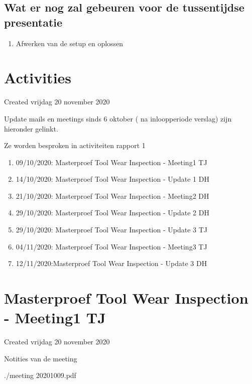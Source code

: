 \documentclass{article}
\begin{document}
\subsection{Wat er nog zal gebeuren voor de tussentijdse presentatie}

\begin{enumerate}[1]
\item Afwerken van de setup en oplossen 
\end{enumerate}





		\section{Activities}

Created vrijdag 20 november 2020



Update mails en meetings sinds 6 oktober ( na inloopperiode verslag) zijn hieronder gelinkt. 

Ze worden besproken in activiteiten rapport 1



\begin{enumerate}[1]
\item 09/10/2020: Masterproef Tool Wear Inspection - Meeting1 TJ
\item 14/10/2020: Masterproef Tool Wear Inspection - Update 1 DH
\item 21/10/2020: Masterproef Tool Wear Inspection - Meeting2 DH
\item 29/10/2020: Masterproef Tool Wear Inspection - Update 2 DH
\item 29/10/2020: Masterproef Tool Wear Inspection - Update 3 TJ
\item 04/11/2020: Masterproef Tool Wear Inspection - Meeting3 TJ
\item 12/11/2020:Masterproef Tool Wear Inspection - Update 3 DH
\end{enumerate}


		\section{Masterproef Tool Wear Inspection - Meeting1 TJ}

Created vrijdag 20 november 2020



Notities van de meeting

./meeting 20201009.pdf
\end{document}
